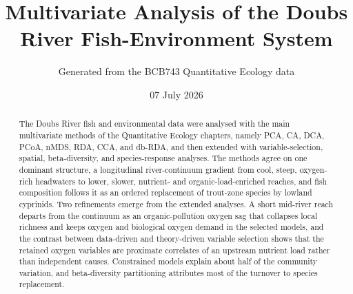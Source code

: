 \documentclass[11pt]{article}
\title{Multivariate Analysis of the Doubs River Fish-Environment System}
\author{Generated from the BCB743 Quantitative Ecology data}
\date{07 July 2026}
\begin{document}
\maketitle
\begin{abstract}
The Doubs River fish and environmental data were analysed with the main multivariate methods of the Quantitative Ecology chapters, namely PCA, CA, DCA, PCoA, nMDS, RDA, CCA, and db-RDA, and then extended with variable-selection, spatial, beta-diversity, and species-response analyses. The methods agree on one dominant structure, a longitudinal river-continuum gradient from cool, steep, oxygen-rich headwaters to lower, slower, nutrient- and organic-load-enriched reaches, and fish composition follows it as an ordered replacement of trout-zone species by lowland cyprinids. Two refinements emerge from the extended analyses. A short mid-river reach departs from the continuum as an organic-pollution oxygen sag that collapses local richness and keeps oxygen and biological oxygen demand in the selected models, and the contrast between data-driven and theory-driven variable selection shows that the retained oxygen variables are proximate correlates of an upstream nutrient load rather than independent causes. Constrained models explain about half of the community variation, and beta-diversity partitioning attributes most of the turnover to species replacement.
\end{abstract}
\end{document}
